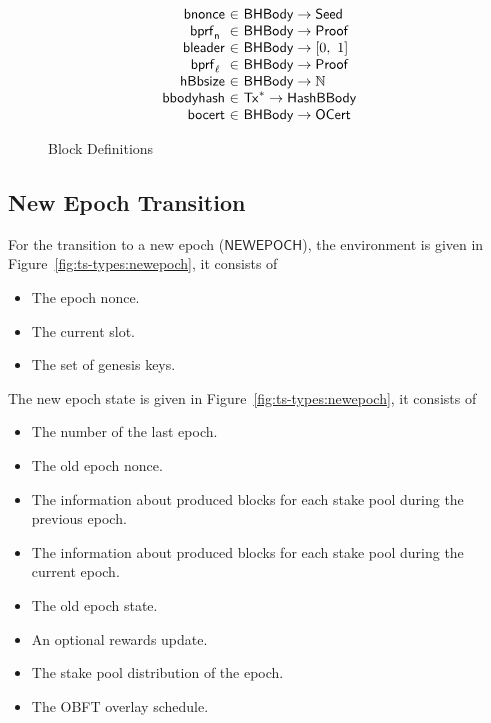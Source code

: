 \begin{figure*}[htb]
\begin{equation*}
\begin{array}{r@{~\in~}lr}
      \fun{bnonce} & \BHBody \to \Seed\\
      \fun{\bprfn{}} & \BHBody \to \Proof\\
      \fun{bleader} & \BHBody \to \unitInterval\\
      \fun{\bprfl{}} & \BHBody \to \Proof\\
      \fun{hBbsize} & \BHBody \to \N \\
      \fun{bbodyhash} & \seqof{\Tx} \to \HashBBody \\
      \fun{bocert} & \BHBody \to \OCert \\
    \end{array}
  \end{equation*}
  \caption{Block Definitions}
  \label{fig:defs:blocks}
\end{figure*}

\clearpage

\subsection{New Epoch Transition}
\label{sec:new-epoch-trans}

For the transition to a new epoch ($\mathsf{NEWEPOCH}$), the environment is
given in Figure~\ref{fig:ts-types:newepoch}, it consists of

\begin{itemize}
\item The epoch nonce.
\item The current slot.
\item The set of genesis keys.
\end{itemize}
The new epoch state is given in Figure~\ref{fig:ts-types:newepoch}, it consists
of

\begin{itemize}
\item The number of the last epoch.
\item The old epoch nonce.
\item The information about produced blocks for each stake pool during the previous epoch.
\item The information about produced blocks for each stake pool during the current epoch.
\item The old epoch state.
\item An optional rewards update.
\item The stake pool distribution of the epoch.
\item The OBFT overlay schedule.
\end{itemize}


